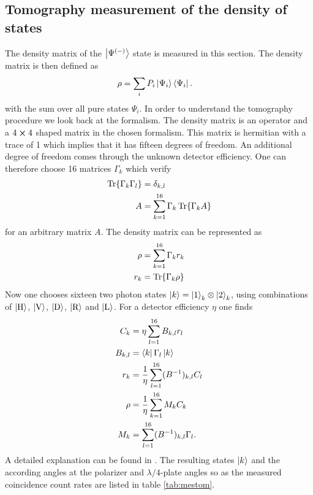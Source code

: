 \subsection{Tomography measurement of the density of states}
The density matrix of the $\ket{\Psi^{(-)}}$ state is measured in this section.
The density matrix is then defined as
\begin{align}
\rho
&=\sum_{i}P_i\ket{\Psi_i}\bra{\Psi_i}.
\label{eq:a:rho}
\end{align}
with the sum over all pure states $\Psi_i$.
In order to understand the tomography procedure we look back at the formalism.
The density matrix is an operator and a $4\cross 4$ shaped matrix in the chosen formalism.
This matrix is hermitian with a trace of 1 which implies that it has fifteen degrees of freedom.
An additional degree of freedom comes through the unknown detector efficiency.
One can therefore choose 16 matrices $\Gamma_k$ which verify
\begin{align}
\Tr{\Gamma_k\Gamma_l}
    &=\delta_{k,l}
    \label{eq:a:trgamma}\\
A
    &=\sum_{k=1}^{16}\Gamma_k\Tr{\Gamma_kA}
    \label{eq:a:A}
\end{align}
for an arbitrary matrix $A$.
The density matrix can be represented as
\begin{align}
\rho
    &=\sum_{k=1}^{16}\Gamma_k r_k
    \label{eq:a:rhogamma}\\
r_k
    &=\Tr{\Gamma_k\rho}
    \label{eq:a:rk}
\end{align}
Now one chooses sixteen two photon states $\ket{k}=\ket{1}_k\otimes\ket{2}_k$, using combinations of $\left|\text{H}\right\rangle$, $\left|\text{V}\right\rangle$, $\left|\text{D}\right\rangle$, $\left|\text{R}\right\rangle$ and $\left|\text{L}\right\rangle$.
For a detector efficiency $\eta$ one finds
\begin{align}
C_k
    &=\eta \sum_{l=1}^{16}B_{k,l}r_l
    \label{eq:a:Ck}\\
B_{k,l}
    &=\bra{k}\Gamma_l\ket{k}
    \label{eq:a:Bkl}\\
r_k
    &=\frac{1}{\eta}\sum_{l=1}^{16}(B^{-1})_{k,l}C_l
    \label{eq:a:rkCl}\\
\rho
    &=\frac{1}{\eta}\sum_{k=1}^{16}M_kC_k
    \label{eq:a:rhoM1}\\
M_k
    &=\sum_{l=1}^{16}(B^{-1})_{k,l}\Gamma_l.
    \label{eq:a:Mk}
\end{align}
A detailed explanation can be found in \cite{james}.
The resulting states $\ket{k}$ and the according angles at the polarizer and $\lambda/4$-plate angles so as the measured coincidence count rates are listed in table \vref{tab:mestom}.
